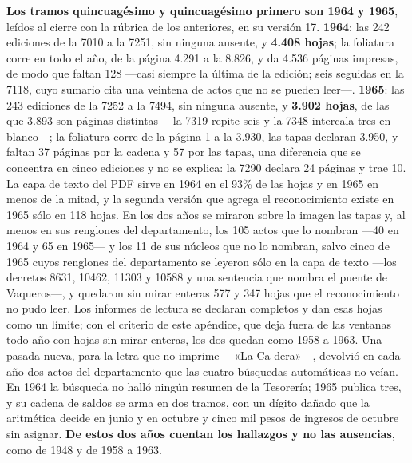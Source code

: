 \textbf{Los tramos quincuagésimo y quincuagésimo primero son 1964 y 1965}, leídos al cierre con la rúbrica de los anteriores, en su versión 17. \textbf{1964}: las 242 ediciones de la 7010 a la 7251, sin ninguna ausente, y \textbf{4.408 hojas}; la foliatura corre en todo el año, de la página 4.291 a la 8.826, y da 4.536 páginas impresas, de modo que faltan 128 ---casi siempre la última de la edición; seis seguidas en la 7118, cuyo sumario cita una veintena de actos que no se pueden leer---. \textbf{1965}: las 243 ediciones de la 7252 a la 7494, sin ninguna ausente, y \textbf{3.902 hojas}, de las que 3.893 son páginas distintas ---la 7319 repite seis y la 7348 intercala tres en blanco---; la foliatura corre de la página 1 a la 3.930, las tapas declaran 3.950, y faltan 37 páginas por la cadena y 57 por las tapas, una diferencia que se concentra en cinco ediciones y no se explica: la 7290 declara 24 páginas y trae 10. La capa de texto del PDF sirve en 1964 en el 93\% de las hojas y en 1965 en menos de la mitad, y la segunda versión que agrega el reconocimiento existe en 1965 sólo en 118 hojas. En los dos años se miraron sobre la imagen las tapas y, al menos en sus renglones del departamento, los 105 actos que lo nombran ---40 en 1964 y 65 en 1965--- y los 11 de sus núcleos que no lo nombran, salvo cinco de 1965 cuyos renglones del departamento se leyeron sólo en la capa de texto ---los decretos 8631, 10462, 11303 y 10588 y una sentencia que nombra el puente de Vaqueros---, y quedaron sin mirar enteras 577 y 347 hojas que el reconocimiento no pudo leer. Los informes de lectura se declaran completos y dan esas hojas como un límite; con el criterio de este apéndice, que deja fuera de las ventanas todo año con hojas sin mirar enteras, los dos quedan como 1958 a 1963. Una pasada nueva, para la letra que no imprime ---«La Ca dera»---, devolvió en cada año dos actos del departamento que las cuatro búsquedas automáticas no veían. En 1964 la búsqueda no halló ningún resumen de la Tesorería; 1965 publica tres, y su cadena de saldos se arma en dos tramos, con un dígito dañado que la aritmética decide en junio y en octubre y cinco mil pesos de ingresos de octubre sin asignar. \textbf{De estos dos años cuentan los hallazgos y no las ausencias}, como de 1948 y de 1958 a 1963.


